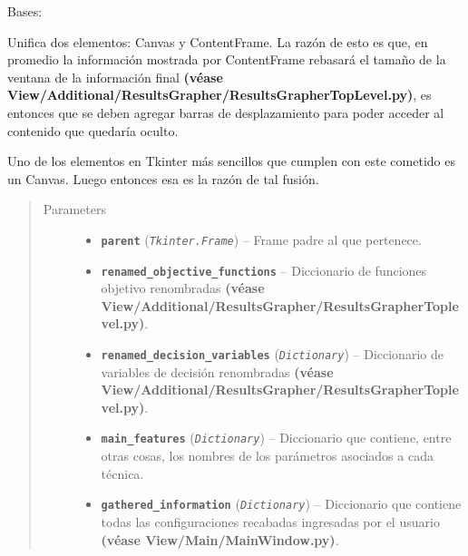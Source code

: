 \documentclass[letterpaper,10pt,english]{sphinxmanual}
\begin{document}
\begin{fulllineitems}
\label{View/Additional/ResultsGrapher/SummaryFrame:View.Additional.ResultsGrapher.SummaryFrame.SummaryFrame}
Bases: 

\begin{DUlineblock}{0em}
\item[] Unifica dos elementos: Canvas y ContentFrame. La razón de esto es que, en promedio la
información mostrada por ContentFrame rebasará el tamaño de la ventana de la información 
final \textbf{(véase View/Additional/ResultsGrapher/ResultsGrapherTopLevel.py)}, es entonces 
que se deben agregar barras de desplazamiento para poder acceder al contenido que quedaría oculto.
\item[] Uno de los elementos en Tkinter más sencillos que cumplen con este cometido es un
Canvas. Luego entonces esa es la razón de tal fusión.
\end{DUlineblock}
\begin{quote}\begin{description}
\item[{Parameters}] \leavevmode\begin{itemize}
\item {} 
\textbf{\texttt{parent}} (\emph{\texttt{Tkinter.Frame}}) -- Frame padre al que pertenece.

\item {} 
\textbf{\texttt{renamed\_objective\_functions}} -- Diccionario de funciones objetivo renombradas 
\textbf{(véase View/Additional/ResultsGrapher/ResultsGrapherToplevel.py)}.

\item {} 
\textbf{\texttt{renamed\_decision\_variables}} (\emph{\texttt{Dictionary}}) -- Diccionario de variables de decisión renombradas  
\textbf{(véase View/Additional/ResultsGrapher/ResultsGrapherToplevel.py)}.

\item {} 
\textbf{\texttt{main\_features}} (\emph{\texttt{Dictionary}}) -- Diccionario que contiene, entre otras cosas, los nombres de los
parámetros asociados a cada técnica.

\item {} 
\textbf{\texttt{gathered\_information}} (\emph{\texttt{Dictionary}}) -- Diccionario que contiene todas las configuraciones 
recabadas ingresadas por el usuario \textbf{(véase View/Main/MainWindow.py)}.


\end{itemize}
\end{description}
\end{quote}
\end{fulllineitems}
\end{document}
